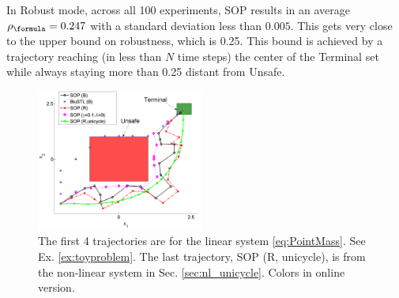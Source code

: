 \begin{exmp}
In Robust mode, across all 100 experiments, SOP results in an average $\rob_{\formula}=0.247$ with a standard deviation less than $0.005$. 
This gets very close to the upper bound on robustness, which is 0.25.
This bound is achieved by a trajectory reaching (in less than $N$ time steps) the center of the Terminal set while always staying more than 0.25 distant from Unsafe. 
\end{exmp}

\begin{figure}[t]
\centering
\includegraphics[width=0.49\textwidth]{figures/ToyExUni_scissored.pdf}
\vspace{-20pt}
\caption{{\small The first 4 trajectories are for the linear system \eqref{eq:PointMass}. See Ex. \ref{ex:toyproblem}. The last trajectory, SOP (R, unicycle), is from the non-linear system in Sec. \ref{sec:nl_unicycle}. Colors in online version.}}
\label{fig:toy control}
\vspace{-10pt}
\end{figure}

